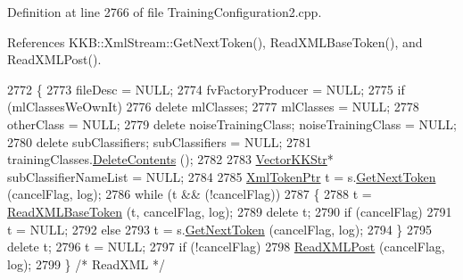 Definition at line 2766 of file Training\+Configuration2.\+cpp.



References K\+K\+B\+::\+Xml\+Stream\+::\+Get\+Next\+Token(), Read\+X\+M\+L\+Base\+Token(), and Read\+X\+M\+L\+Post().


\begin{DoxyCode}
2772 \{
2773   fileDesc          = NULL;
2774   fvFactoryProducer = NULL;
2775   \textcolor{keywordflow}{if}  (mlClassesWeOwnIt)
2776     \textcolor{keyword}{delete}  mlClasses;
2777   mlClasses = NULL;
2778   otherClass = NULL;
2779   \textcolor{keyword}{delete}  noiseTrainingClass;  noiseTrainingClass = NULL;
2780   \textcolor{keyword}{delete}  subClassifiers;      subClassifiers     = NULL;
2781   trainingClasses.\hyperlink{class_k_k_b_1_1_k_k_queue_a72dbe1e65d567536dbf4be3617230254}{DeleteContents} ();
2782 
2783   \hyperlink{class_k_k_b_1_1_vector_k_k_str}{VectorKKStr}*  subClassifierNameList = NULL;
2784 
2785   \hyperlink{class_k_k_b_1_1_xml_token}{XmlTokenPtr} t = s.\hyperlink{class_k_k_b_1_1_xml_stream_a87cc738b05c666cf5d5c25beaab477b4}{GetNextToken} (cancelFlag, log);
2786   \textcolor{keywordflow}{while}  (t  &&  (!cancelFlag))
2787   \{
2788     t = \hyperlink{class_k_k_m_l_l_1_1_training_configuration2_a4e59170ce298651638a3be00b185bbe7}{ReadXMLBaseToken} (t, cancelFlag, log);
2789     \textcolor{keyword}{delete}  t;
2790     \textcolor{keywordflow}{if}  (cancelFlag)
2791       t = NULL;
2792     \textcolor{keywordflow}{else}
2793       t = s.\hyperlink{class_k_k_b_1_1_xml_stream_a87cc738b05c666cf5d5c25beaab477b4}{GetNextToken} (cancelFlag, log);
2794   \}
2795   \textcolor{keyword}{delete} t;
2796   t = NULL;
2797   \textcolor{keywordflow}{if}  (!cancelFlag)
2798     \hyperlink{class_k_k_m_l_l_1_1_training_configuration2_a3aa284a198e844fcac046968d3206409}{ReadXMLPost} (cancelFlag, log);
2799 \}  \textcolor{comment}{/* ReadXML */}
\end{DoxyCode}
